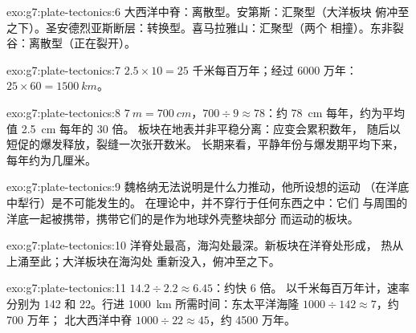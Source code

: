 \begin{solution}{exo:g7:plate-tectonics:6}
大西洋中脊：离散型。安第斯：汇聚型（大洋板块
俯冲至之下）。圣安德烈亚斯断层：转换型。喜马拉雅山：汇聚型（两个
相撞）。东非裂谷：离散型（正在裂开）。
\end{solution}

\begin{solution}{exo:g7:plate-tectonics:7}
$2.5 \times 10 = 25$ 千米每百万年；经过 6000 万年：
$25 \times 60 = \qty{1500}{km}$。
\end{solution}

\begin{solution}{exo:g7:plate-tectonics:8}
$\qty{7}{m} = \qty{700}{cm}$，$700 \div 9 \approx 78$：约
\qty{78}{cm} 每年，约为平均值 \qty{2.5}{cm} 每年的 30 倍。
板块在地表并非平稳分离：应变会累积数年，
随后以短促的爆发释放，裂缝一次张开数米。
长期来看，平静年份与爆发期平均下来，
每年约为几厘米。
\end{solution}

\begin{solution}{exo:g7:plate-tectonics:9}
魏格纳无法说明是什么力推动，他所设想的运动
（在洋底中犁行）是不可能发生的。
在理论中，并不穿行于任何东西之中：它们
与周围的洋底一起被携带，携带它们的是作为地球外壳整块部分
而运动的板块。
\end{solution}

\begin{solution}{exo:g7:plate-tectonics:10}
洋脊处最高，海沟处最深。新板块在洋脊处形成，
热从上涌至此；大洋板块在海沟处
重新没入，俯冲至之下。
\end{solution}

\begin{solution}{exo:g7:plate-tectonics:11}
$14.2 \div 2.2 \approx 6.45$：约快 6 倍。
以千米每百万年计，速率分别为 142 和 22。行进 \qty{1000}{km}
所需时间：东太平洋海隆 $1000 \div 142 \approx 7$，约 700 万年；
北大西洋中脊 $1000 \div 22 \approx 45$，约
4500 万年。
\end{solution}

